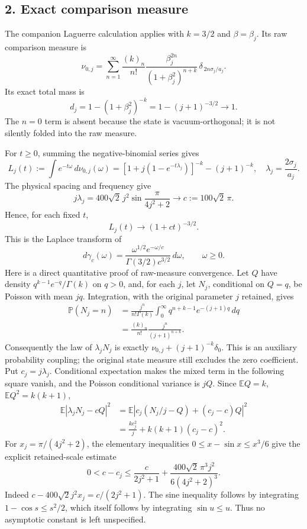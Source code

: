 \documentclass[
  11pt,
]{article}
\begin{document}
\subsection{2. Exact comparison measure}\label{weak-coupling-part-4-exact-comparison-measure}

The companion Laguerre calculation applies with \(k=3/2\) and
\(\beta=\beta_j\). Its raw comparison measure is \[
 \nu_{0,j}=
 \sum_{n=1}^{\infty}
 \frac{(k)_n}{n!}
 \frac{\beta_j^{2n}}{(1+\beta_j^2)^{n+k}}\,
 \delta_{\,2n\sigma_j/a_j}.
 \tag{4}
\] Its exact total mass is \[
 d_j=1-(1+\beta_j^2)^{-k}
     =1-(j+1)^{-3/2}\longrightarrow1.                 \tag{5}
\] The \(n=0\) term is absent because the state is vacuum-orthogonal; it
is not silently folded into the raw measure.

For \(t\ge0\), summing the negative-binomial series gives \[
 L_j(t):=\int e^{-t\omega}\,d\nu_{0,j}(\omega)
 =
 \left[1+j\left(1-e^{-t\lambda_j}\right)\right]^{-k}
 -(j+1)^{-k},
 \quad \lambda_j=\frac{2\sigma_j}{a_j}.                 \tag{6}
\] The physical spacing and frequency give \[
 j\lambda_j
 =400\sqrt2\,j^2\sin\frac{\pi}{4j^2+2}
 \longrightarrow c:=100\sqrt2\,\pi .                  \tag{7}
\] Hence, for each fixed \(t\), \[
 L_j(t)\longrightarrow(1+ct)^{-3/2}.                  \tag{8}
\] This is the Laplace transform of \[
 d\gamma_c(\omega)=
 \frac{\omega^{1/2}e^{-\omega/c}}
 {\Gamma(3/2)c^{3/2}}\,d\omega,\qquad \omega\ge0.       \tag{9}
\] Here is a direct quantitative proof of raw-measure convergence. Let
\(Q\) have density \(q^{k-1}e^{-q}/\Gamma(k)\) on \(q>0\), and, for each
\(j\), let \(N_j\), conditional on \(Q=q\), be Poisson with mean \(jq\).
Integration, with the original parameter \(j\) retained, gives \[
 \begin{split}
 \mathbb P(N_j=n)
 &=\frac{j^n}{n!\Gamma(k)}
     \int_0^\infty q^{n+k-1}e^{-(j+1)q}\,dq\\
 &=\frac{(k)_n}{n!}\frac{j^n}{(j+1)^{n+k}} .
 \end{split}
\] Consequently the law of \(\lambda_jN_j\) is exactly
\(\nu_{0,j}+(j+1)^{-k}\delta_0\). This is an auxiliary probability
coupling; the original state measure still excludes the zero
coefficient. Put \(c_j=j\lambda_j\). Conditional expectation makes the
mixed term in the following square vanish, and the Poisson conditional
variance is \(jQ\). Since \(\mathbb EQ=k\), \(\mathbb EQ^2=k(k+1)\), \[
 \begin{split}
 \mathbb E|\lambda_jN_j-cQ|^2
 &=\mathbb E|c_j(N_j/j-Q)+(c_j-c)Q|^2\\
 &=\frac{kc_j^2}{j}+k(k+1)(c_j-c)^2 .
 \end{split}
\] For \(x_j=\pi/(4j^2+2)\), the elementary inequalities
\(0\le x-\sin x\le x^3/6\) give the explicit retained-scale estimate \[
 0<c-c_j\le
 \frac{c}{2j^2+1}
 +\frac{400\sqrt2\,\pi^3j^2}{6(4j^2+2)^3}.
\] Indeed \(c-400\sqrt2j^2x_j=c/(2j^2+1)\). The sine inequality follows
by integrating \(1-\cos s\le s^2/2\), which itself follows by
integrating \(\sin u\le u\). Thus no asymptotic constant is left
unspecified.
\end{document}
